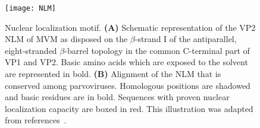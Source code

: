 \makeatletter
\setlength{\@fptop}{0pt}
\makeatother

\begin{figure}[b!]
\centering
  \texttt{[image: NLM]} \\[0.35cm]
  \caption[Nuclear Localization Motif] 
   {Nuclear localization motif. \textbf{(A)} Schematic representation of the VP2 NLM of MVM as disposed on the $\beta$-strand I of the antiparallel, eight-stranded $\beta$-barrel topology in the common C-terminal part of VP1 and VP2. Basic amino acids which are exposed to the solvent are represented in bold. \textbf{(B)} Alignment of the NLM that is conserved among parvoviruses. Homologous positions are shadowed and basic residues are in bold. Sequences with proven nuclear localization capacity are boxed in red. This illustration was adapted from references~\cite{pmid10729155, almendral}.} 
\label{NLM}
\end{figure}


